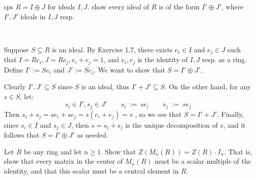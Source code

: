 \nq
\begin{exr}[title=Exercise 1.8]
    sps $R=I\oplus J$ for ideals $I,J$.
	show every ideal of $R$ is of the form $I'\oplus J'$, where $I',J'$ ideals
	in $I,J$ resp.
\end{exr} \

\begin{pf}
	Suppose $S\subseteq R$ is an ideal.
	By Exercise 1.7, there exists $e_{i}\in I$ and $e_{j}\in J$ such that
	$I=Re_{i},J=Re_{j},e_{i}+e_{j}=1$, and $e_{i},e_{j}$ is the identity of
	$I,J$ resp. as a ring.
	Define $I':=Se_{i}$ and $J':=Se_{j}$.
	We want to show that $S=I'\oplus J'$.

	Clearly $I',J'\subseteq S$ since $S$ is an ideal, thus $I'+J'\subseteq S$.
	On the other hand, for any $s \in S$, let:
	\begin{equation*}
	    s_{i}\in I', s_{j}\in J' \qquad
		s_{i} \ := \ se_{i} \qquad s_{j} \ := \ se_{j}
	\end{equation*}
	Then $s_{i}+s_{j} = se_{i}+se_{j} = s(e_{i}+e_{j}) = s$ , so
	we see that $S=I'+J'$.
	Finally, since $s_{i}\in I$ and $s_{j}\in J$,
	then $s = s_{i}+s_{j}$ is the unique decomposition of $s$,
	and it follows that $S=I'\oplus J'$ as needed.
\end{pf}


\nq
\begin{exr}[title=Exercise 1.9]
	Let $R$ be any ring and let $n\geq 1$.
	Show that $Z(M_n(R)) = Z(R)\cdot I_n$.
	That is, show that every matrix in the center of $M_n(R)$ must be
	a scalar multiple of the identity, and that
	this scalar must be a central element in $R$.
\end{exr} \


